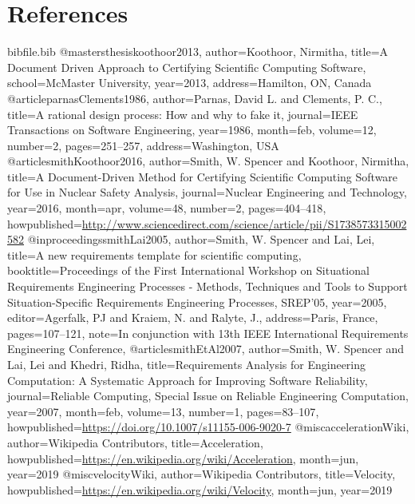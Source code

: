 \documentclass[12pt]{article}
\begin{document}
\section{References}
\label{Sec:References}
\begin{filecontents*}{bibfile.bib}
@mastersthesis{koothoor2013,
author={Koothoor, Nirmitha},
title={A Document Driven Approach to Certifying Scientific Computing Software},
school={McMaster University},
year={2013},
address={Hamilton, ON, Canada}}
@article{parnasClements1986,
author={Parnas, David L. and Clements, P. C.},
title={A rational design process: How and why to fake it},
journal={IEEE Transactions on Software Engineering},
year={1986},
month=feb,
volume={12},
number={2},
pages={251--257},
address={Washington, USA}}
@article{smithKoothoor2016,
author={Smith, W. Spencer and Koothoor, Nirmitha},
title={A Document-Driven Method for Certifying Scientific Computing Software for Use in Nuclear Safety Analysis},
journal={Nuclear Engineering and Technology},
year={2016},
month=apr,
volume={48},
number={2},
pages={404--418},
howpublished={\url{http://www.sciencedirect.com/science/article/pii/S1738573315002582}}}
@inproceedings{smithLai2005,
author={Smith, W. Spencer and Lai, Lei},
title={A new requirements template for scientific computing},
booktitle={Proceedings of the First International Workshop on Situational Requirements Engineering Processes - Methods, Techniques and Tools to Support Situation-Specific Requirements Engineering Processes, SREP'05},
year={2005},
editor={Agerfalk, PJ and Kraiem, N. and Ralyte, J.},
address={Paris, France},
pages={107--121},
note={In conjunction with 13th IEEE International Requirements Engineering Conference,}}
@article{smithEtAl2007,
author={Smith, W. Spencer and Lai, Lei and Khedri, Ridha},
title={Requirements Analysis for Engineering Computation: A Systematic Approach for Improving Software Reliability},
journal={Reliable Computing, Special Issue on Reliable Engineering Computation},
year={2007},
month=feb,
volume={13},
number={1},
pages={83--107},
howpublished={\url{https://doi.org/10.1007/s11155-006-9020-7}}}
@misc{accelerationWiki,
author={Wikipedia Contributors},
title={Acceleration},
howpublished={\url{https://en.wikipedia.org/wiki/Acceleration}},
month=jun,
year={2019}}
@misc{velocityWiki,
author={Wikipedia Contributors},
title={Velocity},
howpublished={\url{https://en.wikipedia.org/wiki/Velocity}},
month=jun,
year={2019}}
\end{filecontents*}
\nocite{*}
\printbibliography[heading=none]
\end{document}
